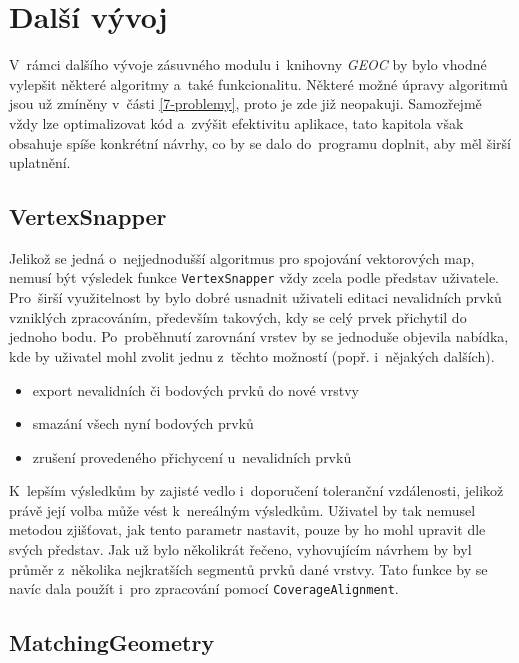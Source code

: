 \chapter{Další vývoj}
\label{9-vyvoj}

V~rámci dalšího vývoje zásuvného modulu i~knihovny \textit{GEOC}
by bylo vhodné vylepšit některé algoritmy a~také funkcionalitu.
Některé možné úpravy algoritmů jsou už zmíněny v~části 
\ref{7-problemy}, proto je zde již neopakuji. 
Samozřejmě vždy lze optimalizovat kód a~zvýšit efektivitu aplikace,
tato kapitola však obsahuje spíše konkrétní návrhy, co by se dalo 
do~programu doplnit, aby měl širší uplatnění.


\section{VertexSnapper}
\label{vs-vyvoj}

Jelikož se jedná o~nejjednodušší algoritmus pro spojování vektorových map,
nemusí být výsledek funkce \texttt{Vertex\-Snapper} vždy zcela podle
představ uživatele. Pro~širší využitelnost by bylo dobré usnadnit
uživateli editaci nevalidních prvků vzniklých zpracováním, především
takových, kdy se celý prvek přichytil do jednoho bodu. Po~proběhnutí
zarovnání vrstev by se jednoduše objevila nabídka, kde by uživatel mohl
zvolit jednu z~těchto možností (popř. i~nějakých dalších). 

\begin{itemize}
 \itemsep5pt  \parskip0pt  %
 \item export nevalidních či bodových prvků do nové vrstvy 
 \item smazání všech nyní bodových prvků
 \item zrušení provedeného přichycení u~nevalidních prvků
\end{itemize}

K~lepším výsledkům by zajisté vedlo i~doporučení toleranční vzdálenosti,
jelikož právě její volba může vést k~nereálným výsledkům. Uživatel by
tak nemusel metodou  zjišťovat, jak tento parametr 
nastavit, pouze by ho mohl upravit dle svých představ. Jak už bylo
několikrát řečeno, vyhovujícím návrhem by byl průměr z~několika
nejkratších segmentů prvků dané vrstvy. Tato funkce by se navíc dala
použít i~pro zpracování pomocí \texttt{Coverage\-Alignment}.


\section{MatchingGeometry}
\label{mg-vyvoj}

